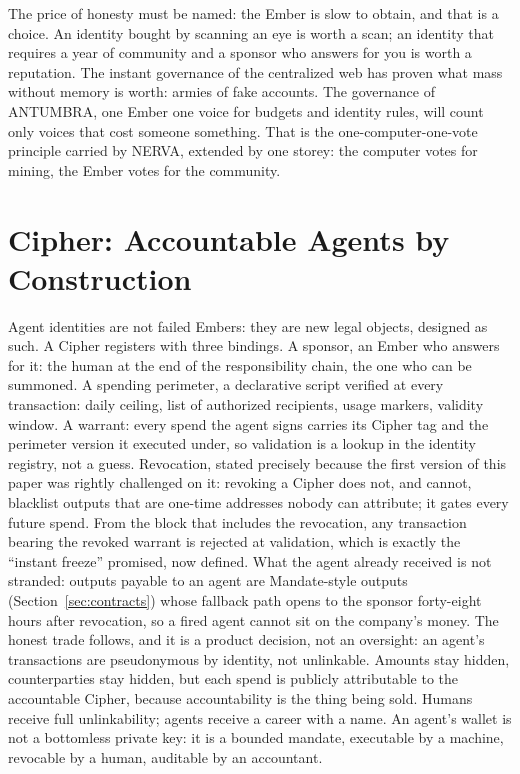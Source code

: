The price of honesty must be named: the Ember is slow to obtain, and that
is a choice. An identity bought by scanning an eye is worth a scan; an
identity that requires a year of community and a sponsor who answers for
you is worth a reputation. The instant governance of the centralized web
has proven what mass without memory is worth: armies of fake accounts.
The governance of ANTUMBRA, one Ember one voice for budgets and identity
rules, will count only voices that cost someone something. That is the
one-computer-one-vote principle carried by NERVA, extended by one storey:
the computer votes for mining, the Ember votes for the community.

\section{Cipher: Accountable Agents by Construction}\label{sec:cipher}

Agent identities are not failed Embers: they are new legal objects,
designed as such. A Cipher registers with three bindings. A sponsor, an
Ember who answers for it: the human at the end of the responsibility
chain, the one who can be summoned. A spending perimeter, a declarative
script verified at every transaction: daily ceiling, list of authorized
recipients, usage markers, validity window. A warrant: every spend the
agent signs carries its Cipher tag and the perimeter version it executed
under, so validation is a lookup in the identity registry, not a guess.
Revocation, stated precisely because the first version of this paper was
rightly challenged on it: revoking a Cipher does not, and cannot,
blacklist outputs that are one-time addresses nobody can attribute; it
gates every future spend. From the block that includes the revocation,
any transaction bearing the revoked warrant is rejected at validation,
which is exactly the ``instant freeze'' promised, now defined. What the
agent already received is not stranded: outputs payable to an agent are
Mandate-style outputs (Section~\ref{sec:contracts}) whose fallback path
opens to the sponsor forty-eight hours after revocation, so a fired agent
cannot sit on the company's money. The honest trade follows, and it is a
product decision, not an oversight: an agent's transactions are
pseudonymous by identity, not unlinkable. Amounts stay hidden,
counterparties stay hidden, but each spend is publicly attributable to
the accountable Cipher, because accountability is the thing being sold.
Humans receive full unlinkability; agents receive a career with a name.
An agent's wallet is not a bottomless private key: it is a bounded
mandate, executable by a machine, revocable by a human, auditable by an
accountant.

